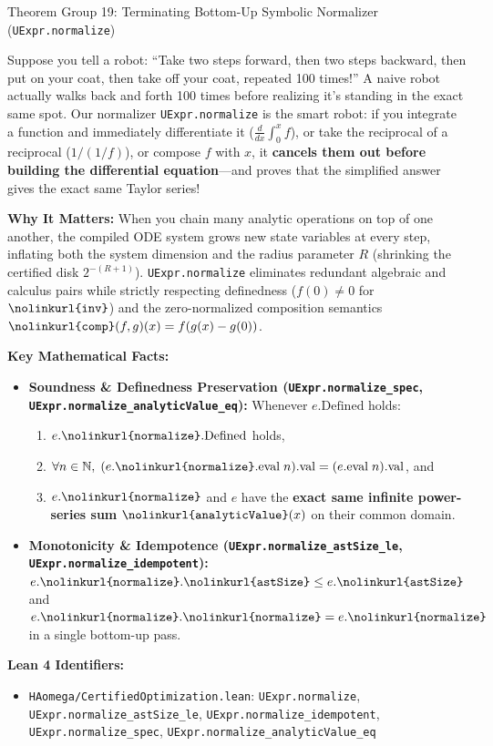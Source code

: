 \documentclass[11pt,a4paper]{article}
\newcommand{\N}{\ensuremath{\mathbb{N}}}
\newcommand{\lean}[1]{\texttt{\nolinkurl{#1}}}
\begin{document}
\begin{thmcard}{Theorem Group 19: Terminating Bottom-Up Symbolic Normalizer (\lean{UExpr.normalize})}
\begin{eli5box}
Suppose you tell a robot: ``Take two steps forward, then two steps backward, then put on your coat, then take off your coat, repeated 100 times!'' A naive robot actually walks back and forth 100 times before realizing it's standing in the exact same spot. Our normalizer \lean{UExpr.normalize} is the smart robot: if you integrate a function and immediately differentiate it ($\frac{d}{dx}\int_0^x f$), or take the reciprocal of a reciprocal ($1/(1/f)$), or compose $f$ with $x$, it \textbf{cancels them out before building the differential equation}---and proves that the simplified answer gives the exact same Taylor series!
\end{eli5box}

\textbf{Why It Matters:}
When you chain many analytic operations on top of one another, the compiled ODE system grows new state variables at every step, inflating both the system dimension and the radius parameter $R$ (shrinking the certified disk $2^{-(R+1)}$). \lean{UExpr.normalize} eliminates redundant algebraic and calculus pairs while strictly respecting definedness ($f(0) \neq 0$ for $\lean{inv}$) and the zero-normalized composition semantics $\lean{comp}(f,g)(x) = f(g(x)-g(0))$.

\textbf{Key Mathematical Facts:}
\begin{itemize}
  \item \textbf{Soundness \& Definedness Preservation (\lean{UExpr.normalize_spec}, \lean{UExpr.normalize_analyticValue_eq}):} Whenever $e.\mathrm{Defined}$ holds:
  \begin{enumerate}
    \item $e.\lean{normalize}.\mathrm{Defined}$ holds,
    \item $\forall n \in \N,\; (e.\lean{normalize}.\mathrm{eval}\;n).\mathrm{val} = (e.\mathrm{eval}\;n).\mathrm{val}$, and
    \item $e.\lean{normalize}$ and $e$ have the \textbf{exact same infinite power-series sum} $\lean{analyticValue}(x)$ on their common domain.
  \end{enumerate}
  \item \textbf{Monotonicity \& Idempotence (\lean{UExpr.normalize_astSize_le}, \lean{UExpr.normalize_idempotent}):} $e.\lean{normalize}.\lean{astSize} \le e.\lean{astSize}$ and $e.\lean{normalize}.\lean{normalize} = e.\lean{normalize}$ in a single bottom-up pass.
\end{itemize}

\textbf{Lean 4 Identifiers:}
\begin{itemize}
  \item \lean{HAomega/CertifiedOptimization.lean}: \lean{UExpr.normalize}, \lean{UExpr.normalize_astSize_le}, \lean{UExpr.normalize_idempotent}, \lean{UExpr.normalize_spec}, \lean{UExpr.normalize_analyticValue_eq}
\end{itemize}
\end{thmcard}
\end{document}
